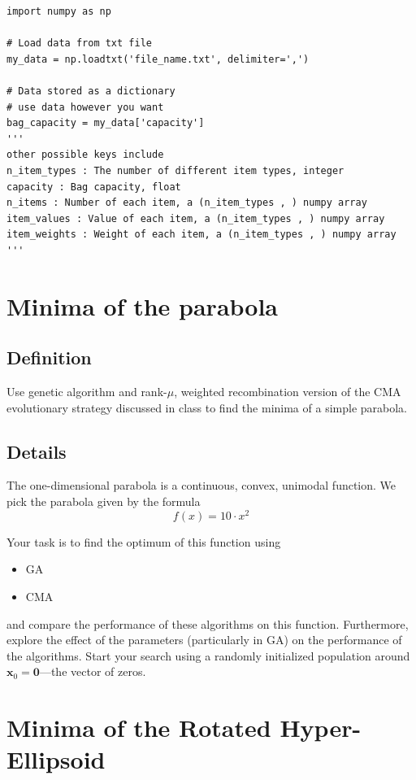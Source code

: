 \documentclass[11pt]{article}
\begin{document}
\begin{verbatim}
import numpy as np

# Load data from txt file
my_data = np.loadtxt('file_name.txt', delimiter=',')

# Data stored as a dictionary
# use data however you want
bag_capacity = my_data['capacity']
'''
other possible keys include
n_item_types : The number of different item types, integer
capacity : Bag capacity, float
n_items : Number of each item, a (n_item_types , ) numpy array
item_values : Value of each item, a (n_item_types , ) numpy array
item_weights : Weight of each item, a (n_item_types , ) numpy array
'''

\end{verbatim}

\section{Minima of the parabola}
\label{sec:org6a9417c}
\subsection{Definition}
\label{sec:orgf0e1dbf}
  Use genetic algorithm and rank-\(\mu\), weighted recombination version of the CMA
evolutionary strategy discussed in class to find the minima of a simple parabola.
\subsection{Details}
\label{sec:org64283fa}
The one-dimensional parabola is a continuous, convex, unimodal function. We
pick the parabola given by the formula
\begin{equation}
f(x) = 10 \cdot x^2
\end{equation}

Your task is to find the optimum of this function using
\begin{itemize}
\item GA
\item CMA
\end{itemize}
and compare the performance of these algorithms on this function.
Furthermore, explore the effect of the parameters (particularly in GA) on the
performance of the algorithms. Start your search using a randomly initialized population around \(\mathbf{x}_0 = \mathbf{0}\)---the vector of zeros.
\section{Minima of the Rotated Hyper-Ellipsoid}
\label{sec:org4cad629}
\end{document}
